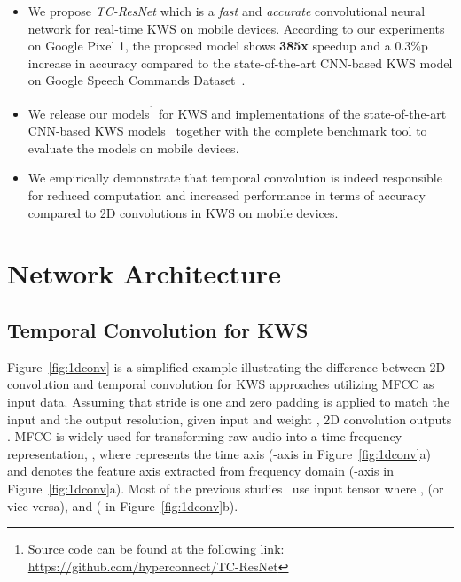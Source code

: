 \documentclass[a4paper]{article}
\begin{document}
\begin{itemize}
    \item We propose \emph{TC-ResNet} which is a \emph{fast} and \emph{accurate} convolutional neural network for real-time KWS on mobile devices. According to our experiments on Google Pixel 1, the proposed model shows \textbf{385x} speedup and a 0.3\%p increase in accuracy compared to the state-of-the-art CNN-based KWS model on Google Speech Commands Dataset~\cite{googlespeechcommandsv1}.
    \item We release our models\footnote{Source code can be found at the following link: \url{https://github.com/hyperconnect/TC-ResNet}} for KWS and implementations of the state-of-the-art CNN-based KWS models~\cite{sainath-interspeech-2015-cnn, zhang-arxiv-2017-helloedge, tang-icassp-2018-residual} together with the complete benchmark tool to evaluate the models on mobile devices.
    \item We empirically demonstrate that temporal convolution is indeed responsible for reduced computation and increased performance in terms of accuracy compared to 2D convolutions in KWS on mobile devices.
\end{itemize}





\section{Network Architecture}\label{section:architecture}

\subsection{Temporal Convolution for KWS}\label{subsection:1dconv}
Figure~\ref{fig:1dconv} is a simplified example illustrating the difference between 2D convolution and temporal convolution for KWS approaches utilizing MFCC as input data.
Assuming that stride is one and zero padding is applied to match the input and the output resolution, given input  and weight , 2D convolution outputs .
MFCC is widely used for transforming raw audio into a time-frequency representation, , where  represents the time axis (-axis in Figure~\ref{fig:1dconv}a) and  denotes the feature axis extracted from frequency domain (-axis in Figure~\ref{fig:1dconv}a).
Most of the previous studies~\cite{zhang-arxiv-2017-helloedge, tang-icassp-2018-residual} use input tensor  where ,  (or vice versa), and  ( in Figure~\ref{fig:1dconv}b).
\end{document}
